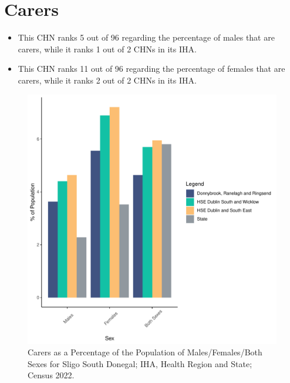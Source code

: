 \documentclass{article}
\begin{document}
\section{Carers}\label{sect:Carers}
\begin{itemize}
\item This CHN ranks  5 out of 96 regarding the percentage of males that are carers, while it ranks   1 out of 2 CHNs in its IHA.
\item This CHN ranks  11 out of 96 regarding the percentage of females that are carers, while it ranks   2 out of 2 CHNs in its IHA.
\end{itemize}
\begin{figure}[H]
	\centering
	\includegraphics[width = 150mm]{../figures/CareED.pdf}
	\caption{Carers as a Percentage of the Population of Males/Females/Both Sexes for Sligo South Donegal; IHA, Health Region and State; Census 2022.}
	\label{fig:2ae19629-1a6a-13a3-e055-000000000001}
	\end{figure}
\end{document}
